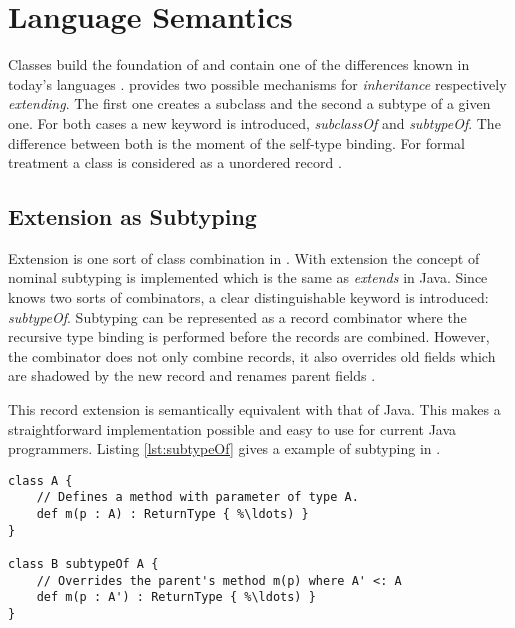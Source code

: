 
\chapter{Language Semantics}
Classes build the foundation of \ooplss and contain one of the
differences known in today's languages
. \ooplss provides two possible
mechanisms for \emph{inheritance} respectively \emph{extending}. The
first one creates a subclass and the second a subtype of a given
one. For both cases a new keyword is introduced, \emph{subclassOf}
and \emph{subtypeOf}. The difference between both is the moment of
the self-type binding. For formal treatment a class is considered as a
unordered record \cite{simons_theory_2002-1}.

\section{Extension as Subtyping}
Extension is one sort of class combination in \ooplss. With extension the concept
of nominal subtyping is implemented which is the same as \emph{extends} in Java.
Since \ooplss knows two sorts of combinators, a clear distinguishable keyword is
introduced: \emph{subtypeOf}. Subtyping can be represented as a record combinator
where the recursive type binding is performed before the records are combined.
However, the combinator does not only combine records, it also overrides old
fields which are shadowed by the new record and renames parent
fields \cite{simons_theory_2003-2}.

This record extension is semantically equivalent with that of Java. This
makes a straightforward implementation possible and easy to use for
current Java programmers. Listing \ref{lst:subtypeOf} gives a example
of subtyping in \ooplss.

\begin{lstlisting}[float,language=ooplss,caption=Subtyping in \ooplss,label=lst:subtypeOf]
class A {
	// Defines a method with parameter of type A.
	def m(p : A) : ReturnType { %\ldots) }
}

class B subtypeOf A {
	// Overrides the parent's method m(p) where A' <: A
	def m(p : A') : ReturnType { %\ldots) }
}
\end{lstlisting}

